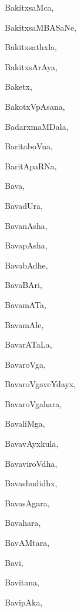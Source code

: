\begin{multicols}{3}
{\noindent
{BakitxsaMca}, \pageref{BakitxsaMca}

\noindent
{BakitxsaMBASaNe}, \pageref{BakitxsaMBASaNe}

\noindent
{Bakitxsathxla}, \pageref{Bakitxsathxla}

\noindent
{BakitxsArAya}, \pageref{BakitxsArAya}

\noindent
{Baketx}, \pageref{Baketx}

\noindent
{BakotxVpAsana}, \pageref{BakotxVpAsana}

\noindent
{BadarxmaMDala}, \pageref{BadarxmaMDala}

\noindent
{BaritaboVna}, \pageref{BaritaboVna}

\noindent
{BaritApaRNa}, \pageref{BaritApaRNa}

\noindent
{Bava}, \pageref{Bava}

\noindent
{BavadUra}, \pageref{BavadUra}

\noindent
{BavanAsha}, \pageref{BavanAsha}

\noindent
{BavapAsha}, \pageref{BavapAsha}

\noindent
{BavabAdhe}, \pageref{BavabAdhe}

\noindent
{BavaBAri}, \pageref{BavaBAri}

\noindent
{BavamATa}, \pageref{BavamATa}

\noindent
{BavamAle}, \pageref{BavamAle}

\noindent
{BavarATaLa}, \pageref{BavarATaLa}

\noindent
{BavaroVga}, \pageref{BavaroVga}

\noindent
{BavaroVgaveYdayx}, \pageref{BavaroVgaveYdayx}

\noindent
{BavaroVgahara}, \pageref{BavaroVgahara}

\noindent
{BavaliMga}, \pageref{BavaliMga}

\noindent
{BavavAyxkula}, \pageref{BavavAyxkula}

\noindent
{BavaviroVdha}, \pageref{BavaviroVdha}

\noindent
{Bavashudidhx}, \pageref{Bavashudidhx}

\noindent
{BavasAgara}, \pageref{BavasAgara}

\noindent
{Bavahara}, \pageref{Bavahara}

\noindent
{BavAMtara}, \pageref{BavAMtara}

\noindent
{Bavi}, \pageref{Bavi}

\noindent
{Bavitana}, \pageref{Bavitana}

\noindent
{BavipAka}, \pageref{BavipAka}

}
\end{multicols}
